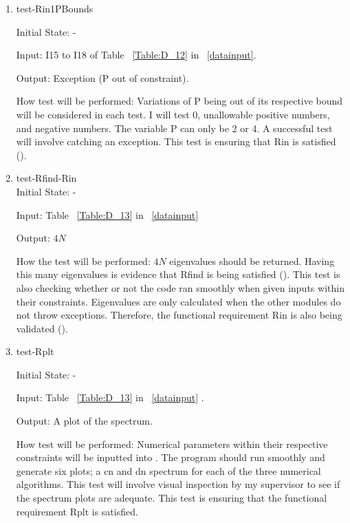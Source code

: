 \documentclass[12pt, titlepage]{article}
\begin{document}
\begin{enumerate}
\item{test-Rin1PBounds\\}	

Initial State: -

Input: I15 to I18 of Table ~\ref{Table:D_12} in ~\ref{datainput}.

Output: Exception (P out of constraint).

How test will be performed: Variations of P being out of its respective bound 
will be considered in each test. I will test 0, unallowable positive numbers, 
and negative numbers. The variable P 
can only be 2 or 4. A successful test will involve catching an exception. This 
test is ensuring that Rin is satisfied (\cite{SRS}). \\
					
\item{test-Rfind-Rin\\} 
\label{Rfind}
Initial State: - 

Input: Table ~\ref{Table:D_13} in ~\ref{datainput}

Output: $4N$

How the test will be performed: $4N$ eigenvalues should be returned. Having 
this many eigenvalues is evidence that Rfind is being satisfied (\cite{SRS}). 
This 
test is also checking whether or not the code ran smoothly when given inputs 
within their constraints. Eigenvalues are only calculated when the other 
modules do not throw exceptions. Therefore, the functional requirement Rin is 
also being validated (\cite{SRS}). \\

\item{test-Rplt} 

Initial State: -

Input: Table ~\ref{Table:D_13} in ~\ref{datainput} .

Output: A plot of the spectrum.

How test will be performed: Numerical parameters within their respective 
constraints will be inputted into \progname. The program should run smoothly 
and generate six plots; a cn and dn spectrum for each of the three numerical 
algorithms. This test will involve visual 
inspection by my supervisor to see if the spectrum plots are adequate. This 
test is ensuring that the functional requirement Rplt is satisfied.  \\
 

\end{enumerate}
\end{document}
